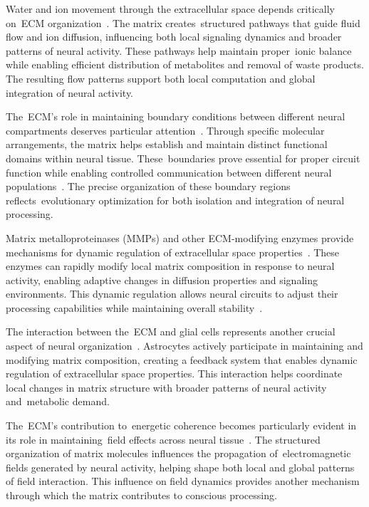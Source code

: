 Water and ion movement through the extracellular space depends critically on~ECM organization~\cite{Hrabetova2009, Sykova2008}. The matrix creates~structured pathways that guide fluid flow and ion diffusion, influencing both local signaling dynamics and broader patterns of neural activity. These pathways help maintain proper~ionic balance while enabling efficient distribution of metabolites and removal of waste products. The resulting flow patterns support both local computation and global integration of neural activity.

The~ECM's role in maintaining boundary conditions between different neural compartments deserves particular attention~\cite{Barros2011, Barker2018}. Through specific molecular arrangements, the matrix helps establish and maintain distinct functional domains within neural tissue. These~boundaries prove essential for proper circuit function while enabling controlled communication between different neural populations~\cite{Frischknecht2012, Song2018}. The precise organization of these boundary regions reflects~evolutionary optimization for both isolation and integration of neural processing.

Matrix metalloproteinases (MMPs) and other ECM-modifying enzymes provide mechanisms for dynamic regulation of extracellular space properties~\cite{Dityatev2003, Ferrer-Ferrer2018}. These enzymes can rapidly modify local matrix composition in response to neural activity, enabling adaptive changes in diffusion properties and signaling environments. This dynamic regulation allows neural circuits to adjust their processing capabilities while maintaining overall stability~\cite{Song2018, Dityatev2010}.

The interaction between the~ECM and glial cells represents another crucial aspect of neural organization~\cite{Vargova2014, Verkhratsky2018}. Astrocytes actively participate in maintaining and modifying matrix composition, creating a feedback system that enables dynamic regulation of extracellular space properties. This interaction helps coordinate local changes in matrix structure with broader patterns of neural activity and~metabolic demand.

The~ECM's contribution to~energetic coherence becomes particularly evident in its role in maintaining~field effects across neural tissue~\cite{Sykova2008, hunt2024electromagnetic}. The structured organization of matrix molecules influences the propagation of~electromagnetic fields generated by neural activity, helping shape both local and global patterns of field interaction. This influence on field dynamics provides another mechanism through which the matrix contributes to conscious processing.

